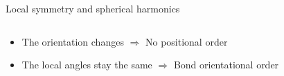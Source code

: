 \documentclass{beamer}
\begin{document}
\begin{frame}[label=local_sym_sh]{Local symmetry and spherical harmonics}
\begin{columns}
	\end{columns}
	\begin{itemize}
		\item The orientation changes $\Rightarrow$ No positional order
		\item The local angles stay the same $\Rightarrow$ Bond orientational order
	\end{itemize}
	{\footnotesize\citet{steinhardt1983boo}}
\end{frame}
\end{document}

